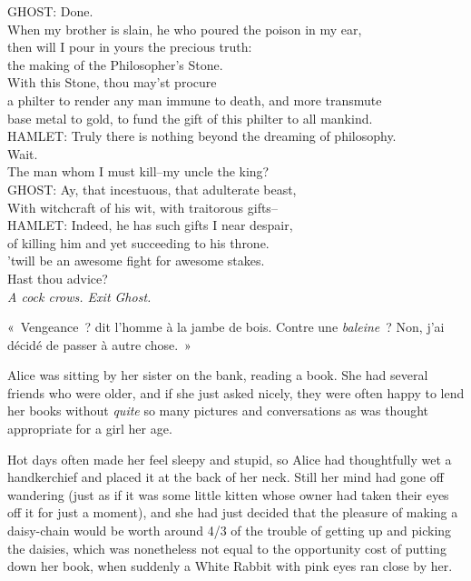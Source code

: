 \begin{playdialog}
GHOST: Done.\\
When my brother is slain, he who poured the poison in my ear,\\
then will I pour in yours the precious truth:\\
the making of the Philosopher’s Stone.\\
With this Stone, thou may’st procure\\
a philter to render any man immune to death, and more transmute\\ base metal to gold, to fund the gift of this philter to all mankind.\\

HAMLET: Truly there is nothing beyond the dreaming of philosophy.\\ Wait.\\ The man whom I must kill--my uncle the king?\\

GHOST: Ay, that incestuous, that adulterate beast,\\
With witchcraft of his wit, with traitorous gifts--\\

HAMLET: Indeed, he has such gifts I near despair,\\
of killing him and yet succeeding to his throne.\\
’twill be an awesome fight for awesome stakes.\\
Hast thou advice?\\

\emph{A cock crows.
Exit Ghost.}
\end{playdialog}


«~Vengeance~? dit l'homme à la jambe de bois.
Contre une \emph{baleine}~?
Non, j'ai décidé de passer à autre chose.~»


Alice was sitting by her sister on the bank, reading a book.
She had several friends who were older, and if she just asked nicely, they were often happy to lend her books without \emph{quite} so many pictures and conversations as was thought appropriate for a girl her age.

Hot days often made her feel sleepy and stupid, so Alice had thoughtfully wet a handkerchief and placed it at the back of her neck.
Still her mind had gone off wandering (just as if it was some little kitten whose owner had taken their eyes off it for just a moment), and she had just decided that the pleasure of making a daisy-chain would be worth around 4/3 of the trouble of getting up and picking the daisies, which was nonetheless not equal to the opportunity cost of putting down her book, when suddenly a White Rabbit with pink eyes ran close by her.

